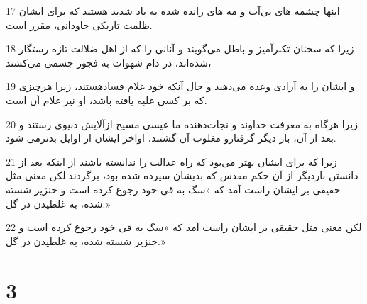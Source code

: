 \par 17 اینها چشمه های بی‌آب و مه های رانده شده به باد شدید هستند که برای ایشان ظلمت تاریکی جاودانی، مقرر است.
\par 18 زیرا که سخنان تکبرآمیز و باطل می‌گویند و آنانی را که از اهل ضلالت تازه رستگار شده‌اند، در دام شهوات به فجور جسمی می‌کشند،
\par 19 و ایشان را به آزادی وعده می‌دهند و حال آنکه خود غلام فسادهستند، زیرا هرچیزی که بر کسی غلبه یافته باشد، او نیز غلام آن است.
\par 20 زیرا هرگاه به معرفت خداوند و نجات‌دهنده ما عیسی مسیح ازآلایش دنیوی رستند و بعد از آن، بار دیگر گرفتارو مغلوب آن گشتند، اواخر ایشان از اوایل بدترمی شود.
\par 21 زیرا که برای ایشان بهتر می‌بود که راه عدالت را ندانسته باشند از اینکه بعد از دانستن باردیگر از آن حکم مقدس که بدیشان سپرده شده بود، برگردند.لکن معنی مثل حقیقی بر ایشان راست آمد که «سگ به قی خود رجوع کرده است و خنزیر شسته شده، به غلطیدن در گل.»
\par 22 لکن معنی مثل حقیقی بر ایشان راست آمد که «سگ به قی خود رجوع کرده است و خنزیر شسته شده، به غلطیدن در گل.»

\chapter{3}

